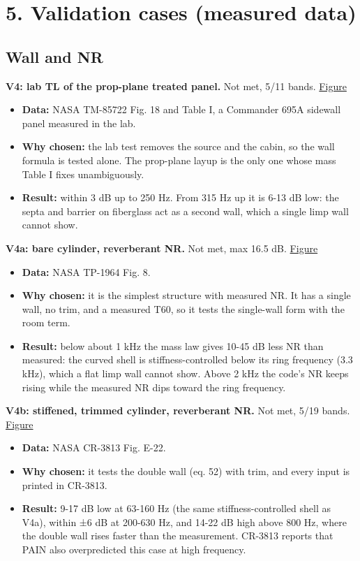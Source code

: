 \documentclass[10pt,a4paper]{article}
\begin{document}
\section*{5. Validation cases (measured data)}

\subsection*{Wall and NR}

\textbf{V4: lab TL of the prop-plane treated panel.} Not met, 5/11 bands. \href{../figures/V4.png}{Figure}

\begin{itemize}
\item \textbf{Data:} NASA TM-85722 Fig. 18 and Table I, a Commander 695A sidewall panel measured in the lab.
\item \textbf{Why chosen:} the lab test removes the source and the cabin, so the wall formula is tested alone. The prop-plane layup is the only one whose mass Table I fixes unambiguously.
\item \textbf{Result:} within 3 dB up to 250 Hz. From 315 Hz up it is 6-13 dB low: the septa and barrier on fiberglass act as a second wall, which a single limp wall cannot show.
\end{itemize}

\textbf{V4a: bare cylinder, reverberant NR.} Not met, max 16.5 dB. \href{../figures/V4a.png}{Figure}

\begin{itemize}
\item \textbf{Data:} NASA TP-1964 Fig. 8.
\item \textbf{Why chosen:} it is the simplest structure with measured NR. It has a single wall, no trim, and a measured T60, so it tests the single-wall form with the room term.
\item \textbf{Result:} below about 1 kHz the mass law gives 10-45 dB less NR than measured: the curved shell is stiffness-controlled below its ring frequency (3.3 kHz), which a flat limp wall cannot show. Above 2 kHz the code's NR keeps rising while the measured NR dips toward the ring frequency.
\end{itemize}

\textbf{V4b: stiffened, trimmed cylinder, reverberant NR.} Not met, 5/19 bands. \href{../figures/V4b.png}{Figure}

\begin{itemize}
\item \textbf{Data:} NASA CR-3813 Fig. E-22.
\item \textbf{Why chosen:} it tests the double wall (eq. 52) with trim, and every input is printed in CR-3813.
\item \textbf{Result:} 9-17 dB low at 63-160 Hz (the same stiffness-controlled shell as V4a), within ±6 dB at 200-630 Hz, and 14-22 dB high above 800 Hz, where the double wall rises faster than the measurement. CR-3813 reports that PAIN also overpredicted this case at high frequency.
\end{itemize}
\end{document}
